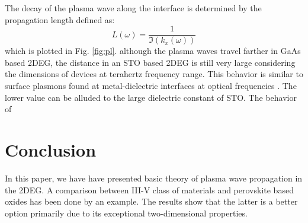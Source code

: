 \documentclass[conference, 10pt]{IEEEtran}
\renewcommand{\O}{\omega}  %
\renewcommand{\^}{\hat}  %
\begin{document}
The decay of the plasma wave along the interface is determined by the propagation length defined as:
%
\begin{equation}
  L(\O) = \frac{1}{\Im (k_x(\O))}
  \label{eq:plength}
\end{equation}
%
which is plotted in Fig. \ref{fig:pl}. although the plasma waves travel farther in GaAs based 2DEG, the distance in an STO based 2DEG is still very large considering the dimensions of devices at terahertz frequency range. This behavior is similar to surface plasmons found at metal-dielectric interfaces at optical frequencies \cite{nevels2014behavior}. The lower value can be alluded to the large dielectric constant of STO. The behavior of

\section{Conclusion}
%
In this paper, we have have presented basic theory of plasma wave propagation in the 2DEG. A comparison between III-V class of materials and perovskite based oxides has been done by an example. The results show that the latter is a better option primarily due to its exceptional two-dimensional properties. 
%


\end{document}
